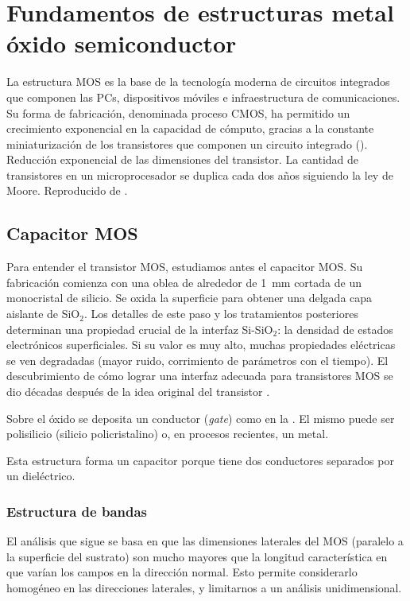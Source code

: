 \section{Fundamentos de estructuras metal óxido semiconductor}
La estructura MOS es la base de la tecnología moderna de 
circuitos integrados
que componen las PCs, dispositivos móviles e infraestructura de comunicaciones.
Su forma de fabricación, denominada proceso CMOS,
ha permitido un crecimiento exponencial en la capacidad de cómputo,
gracias a la constante miniaturización de los transistores que componen un
circuito integrado ().
{Reducción exponencial de las dimensiones del transistor.
La cantidad de transistores en un microprocesador se duplica cada dos años 
siguiendo la ley de Moore\cite{moore_cramming_2006}.
Reproducido de \cite{sedra_microelectronic_2010}.}
\subsection{Capacitor MOS}
Para entender el transistor MOS, estudiamos antes el capacitor MOS.
Su fabricación comienza con una oblea de alrededor de \SI{1}{\milli\meter} cortada de un monocristal de silicio.
Se oxida la superficie para obtener una delgada capa aislante de SiO$_2$.
Los detalles de este paso y los tratamientos posteriores
determinan una propiedad crucial de la interfaz Si-SiO$_2$:
la densidad de estados electrónicos superficiales.
Si su valor es muy alto, 
muchas propiedades eléctricas se ven degradadas 
(mayor ruido, corrimiento de parámetros con el tiempo).
El descubrimiento de cómo lograr una interfaz adecuada para transistores MOS
se dio décadas después de la idea original del transistor
\cite{chih-tang_evolution_1988}.

Sobre el óxido se deposita un conductor (\emph{gate}) 
como en la .
El mismo puede ser polisilicio (silicio policristalino) o,
en procesos recientes, un metal.

Esta estructura forma un capacitor porque tiene dos conductores separados por un
dieléctrico.
%
\subsubsection{Estructura de bandas}
El análisis que sigue se basa en que las dimensiones laterales del MOS 
(paralelo a la superficie del sustrato) son mucho mayores que 
la longitud característica en que varían los campos en la dirección normal.
Esto permite considerarlo homogéneo en las direcciones laterales,
y limitarnos a un análisis unidimensional.

